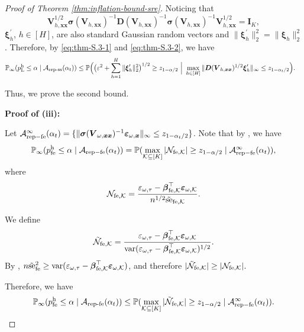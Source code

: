 \documentclass[12pt]{article}
\newcommand{\hpfe}{p_\textnormal{fe}^{\textnormal{h}}}
\newcommand{\se}{\textnormal{se}}
\newcommand{\Prob}{\mathbb{P}}
\newcommand{\var}{\operatorname{var}}
\newcommand{\mk}{\mathcal{K}}
\newcommand{\ma}{\mathcal{A}}
\newcommand{\repss}{\textnormal{rep-ss}}
\newcommand{\repfe}{\textnormal{rep-fe}}
\newcommand{\rep}{\textnormal{rep}}
\newcommand{\fe}{\textnormal{fe}}
\newcommand{\bs}{\boldsymbol}
\newcommand{\hpL}{p_\textnormal{L}^{\textnormal{h}}}
\begin{document}
\begin{proof}[Proof of Theorem \ref{thm:inflation-bound-sre}]
Noticing that 
\[
\bs{V}_{h, \bs{x}\bs{x}}^{1/2} \bs{\sigma}(\bs{V}_{h,\bs{x}\bs{x}})^{-1} \bs{D}(\bs{V}_{h,\bs{x}\bs{x}})^{-1} \bs{\sigma}(\bs{V}_{h,\bs{x}\bs{x}})^{-1}\bs{V}_{h, \bs{x}\bs{x}}^{1/2} = \bs{I}_K,
\]
 $\bs{\xi}_h^\prime$, $h\in [H]$, are also standard Gaussian random vectors and $\|\bs{\xi}_h^\prime\|_2^2 = \|\bs{\xi}_h\|_2^2$. Therefore, by \eqref{eq:thm-S.3-1} and \eqref{eq:thm-S.3-2}, we have
 \begin{align*}
     &\Prob_{\infty}( \hpL \leq \alpha\mid \ma_{\repss}(\alpha_t)) \leq \Prob \Big(\big(\varepsilon^{2}+\sum_{h=1}^H \|\bs{\xi}_h^\prime\|_2^2 \big)^{1/2} \geq z_{1-\alpha/2}~\Big | ~ \max_{h\in  [H] } \|\bs{D}(\bs{V}_{h,\bs{x}\bs{x}})^{1/2}\bs{\xi}_h^\prime\|_{\infty} \leq z_{1-\alpha_t/2}\Big).
 \end{align*}


Thus, we prove the second bound.

\noindent \textbf{Proof of  (iii):}

Let $\ma_{\rep-\fe}^\infty(\alpha_t) = \{\|\bs{\sigma}(\bs{V}_{\omega,\bs{x}\bs{x}})^{-1}\bs{\varepsilon}_{\omega,\bs{x}}\|_{\infty} \leq z_{1-\alpha_t/2}\}$. Note that by , we have
\begin{align*}
  \Prob_\infty(\hpfe \leq \alpha \mid \ma_{\rep-\fe}(\alpha_t)) = \Prob(\max_{\mk \subseteq [K]}|\mathcal{N}_{\fe , \mk}| \geq z_{1-\alpha/2}\mid \ma_{\rep-\fe}^\infty(\alpha_t)) , 
\end{align*}
where 
\[
\mathcal{N}_{\fe , \mk} = \frac{\varepsilon_{\omega,\tau}-\bs{\beta}_{\fe ,\mk}^\top \bs{\varepsilon}_{\omega, \mk}}{n^{1/2}\tilde{\se}_{\fe , \mk}}.
\]

We define
\[
\tilde{\mathcal{N}}_{\fe ,\mk} = \frac{\varepsilon_{\omega,\tau}-\bs{\beta}_{\fe , \mk}^\top \bs{\varepsilon}_{\omega, \mk}}{\var(\varepsilon_{\omega,\tau}-\bs{\beta}_{\fe , \mk}^\top \bs{\varepsilon}_{\omega, \mk})^{1/2}}.
\]
By , $n\tilde{\se}_{\fe }^2 \geq \var(\varepsilon_{\omega,\tau}-\bs{\beta}_{\fe ,\mk}^\top \bs{\varepsilon}_{\omega, \mk})$, and therefore $|\tilde{\mathcal{N}}_{\fe ,\mk}| \geq |\mathcal{N}_{\fe , \mk}|$.

Therefore, we have
\begin{align*}
     \Prob_{\infty}( \hpfe \leq \alpha\mid \ma_{\repfe}(\alpha_t)) \leq \Prob(\max_{\mk \subseteq [K]}|\tilde{\mathcal{N}}_{\fe , \mk}| \geq z_{1-\alpha/2}\mid \ma_{\rep-\fe}^\infty(\alpha_t)).
\end{align*}


\end{proof}
\end{document}
